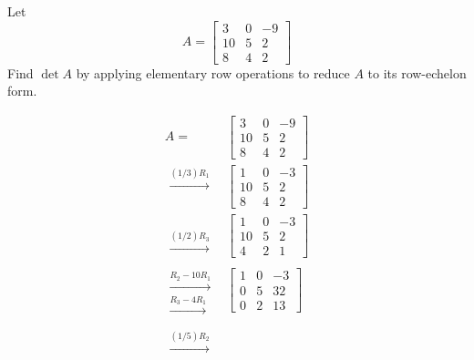 \documentclass{ximera}
\begin{document}
\begin{example}
Let $$A=\begin{bmatrix}3&0&-9\\10&5&2\\8&4&2 \end{bmatrix}$$
Find $\det{A}$ by applying elementary row operations to reduce $A$ to its row-echelon form.

\begin{explanation}
\begin{align}A=&\left[\begin{array}{ccc}  
 3&0&-9\\10&5&2\\8&4&2
 \end{array}\right]\nonumber\\
 \begin{array}{c}
 \xrightarrow{(1/3)R_1}\\
 \\
\\
 \end{array}
 &\left[\begin{array}{ccc}  
 1&0&-3\\10&5&2\\8&4&2
 \end{array}\right]\label{eq:refstep1}\\
 \begin{array}{c}
 \\
 \\
\xrightarrow{(1/2)R_3}
\end{array}
&\left[\begin{array}{ccc}  
 1&0&-3\\10&5&2\\4&2&1
 \end{array}\right]\label{eq:refstep2}\\
 \begin{array}{c}
 \\
 \xrightarrow{R_2-10R_1}\\
\xrightarrow{R_3-4R_1}
\end{array}&\left[\begin{array}{ccc}  
 1&0&-3\\0&5&32\\0&2&13
 \end{array}\right]\label{eq:refstep3}\\
 \begin{array}{c}
 \\
 \xrightarrow{(1/5)R_2}\\
 \\

\end{array}
\end{align}
\end{explanation}
\end{example}
\end{document}
